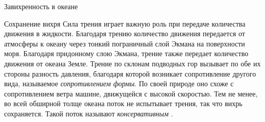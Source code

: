 \begin{chapter}{Завихренность в океане}
\begin{section}{Сохранение вихря}
Сила трения играет важную роль при передаче количества движения в
жидкости. Благодаря трению количество движения передается от атмосферы 
к океану через тонкий пограничный слой Экмана
на поверхности моря. Благодаря придонному слою Экмана, трение также
передает количество движения от океана Земле.
Трение по склонам подводных гор вызывает по обе их стороны разность давления,
благодаря которой возникает сопротивление другого вида, называемое 
\emph{сопротивлением формы}.
По своей природе оно схоже с сопротивлением ветра машине, движущейся с высокой 
скоростью. Тем не менее, во всей обширной толще океана
поток не испытывает трения, так что вихрь сохраняется. 
Такой поток называют \emph{консервативным}%
%
.
%


\end{section}
\end{chapter}
